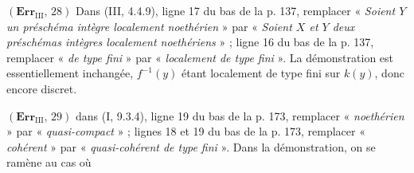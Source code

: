 \noindent\textbf{$(\mathbf{Err}_{\mathrm{III}},\,28)$} Dans (III, 4.4.9),
ligne 17 du bas de la p. 137, remplacer « \emph{Soient $Y$ un préschéma
intègre localement noethérien} » par « \emph{Soient $X$ et $Y$ deux
préschémas intègres localement noethériens} » ; ligne 16 du bas de la p.
137, remplacer « \emph{de type fini} » par « \emph{localement de type
fini} ». La démonstration est essentiellement inchangée,
$f^{-1}(y)$ étant localement de type fini sur $k(y)$, donc encore discret.

\noindent\textbf{$(\mathbf{Err}_{\mathrm{III}},\,29)$} dans (I, 9.3.4), ligne
19 du bas de la p. 173, remplacer « \emph{noethérien} » par
« \emph{quasi-compact} » ; lignes 18 et 19 du bas de la p. 173, remplacer
« \emph{cohérent} » par « \emph{quasi-cohérent de type fini} ». Dans la
démonstration, on se ramène au cas où

